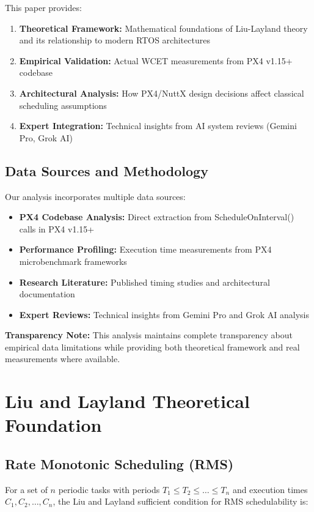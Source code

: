 \documentclass[12pt,a4paper]{article}
\begin{document}
This paper provides:
\begin{enumerate}
\item \textbf{Theoretical Framework:} Mathematical foundations of Liu-Layland theory and its relationship to modern RTOS architectures
\item \textbf{Empirical Validation:} Actual WCET measurements from PX4 v1.15+ codebase
\item \textbf{Architectural Analysis:} How PX4/NuttX design decisions affect classical scheduling assumptions
\item \textbf{Expert Integration:} Technical insights from AI system reviews (Gemini Pro, Grok AI)
\end{enumerate}

\subsection{Data Sources and Methodology}

Our analysis incorporates multiple data sources:
\begin{itemize}
\item \textbf{PX4 Codebase Analysis:} Direct extraction from ScheduleOnInterval() calls in PX4 v1.15+
\item \textbf{Performance Profiling:} Execution time measurements from PX4 microbenchmark frameworks
\item \textbf{Research Literature:} Published timing studies and architectural documentation
\item \textbf{Expert Reviews:} Technical insights from Gemini Pro and Grok AI analysis
\end{itemize}

\textbf{Transparency Note:} This analysis maintains complete transparency about empirical data limitations while providing both theoretical framework and real measurements where available.

\section{Liu and Layland Theoretical Foundation}

\subsection{Rate Monotonic Scheduling (RMS)}

For a set of $n$ periodic tasks with periods $T_1 \leq T_2 \leq \ldots \leq T_n$ and execution times $C_1, C_2, \ldots, C_n$, the Liu and Layland sufficient condition for RMS schedulability is:
\end{document}
